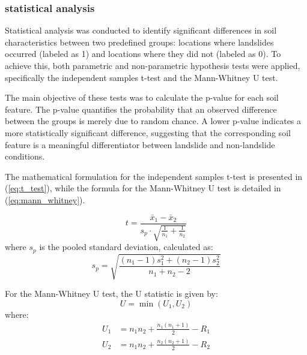 \subsubsection{statistical analysis}
Statistical analysis was conducted to identify significant differences in soil characteristics between two predefined groups: locations where landslides occurred (labeled as 1) and locations where they did not (labeled as 0). To achieve this, both parametric and non-parametric hypothesis tests were applied, specifically the independent samples t-test and the Mann-Whitney U test\cite{mthd04}.

The main objective of these tests was to calculate the p-value for each soil feature. The p-value quantifies the probability that an observed difference between the groups is merely due to random chance. A lower p-value indicates a more statistically significant difference, suggesting that the corresponding soil feature is a meaningful differentiator between landslide and non-landslide conditions.

The mathematical formulation for the independent samples t-test is presented in (\ref{eq:t_test}), while the formula for the Mann-Whitney U test is detailed in (\ref{eq:mann_whitney}).

\begin{equation} \label{eq:t_test}
t = \frac{\bar{x}_1 - \bar{x}_2}{s_p \cdot \sqrt{\frac{1}{n_1} + \frac{1}{n_2}}}
\end{equation}
where $s_p$ is the pooled standard deviation, calculated as:
\begin{equation} \label{eq:sp_pooled}
s_p = \sqrt{\frac{(n_1 - 1)s_1^2 + (n_2 - 1)s_2^2}{n_1 + n_2 - 2}}
\end{equation}

For the Mann-Whitney U test, the U statistic is given by:
\begin{equation} \label{eq:mann_whitney}
U = \min(U_1, U_2)
\end{equation}
where:
\begin{align}
U_1 &= n_1n_2 + \frac{n_1(n_1 + 1)}{2} - R_1 \label{eq:U1} \\
U_2 &= n_1n_2 + \frac{n_2(n_2 + 1)}{2} - R_2 \label{eq:U2}
\end{align}
